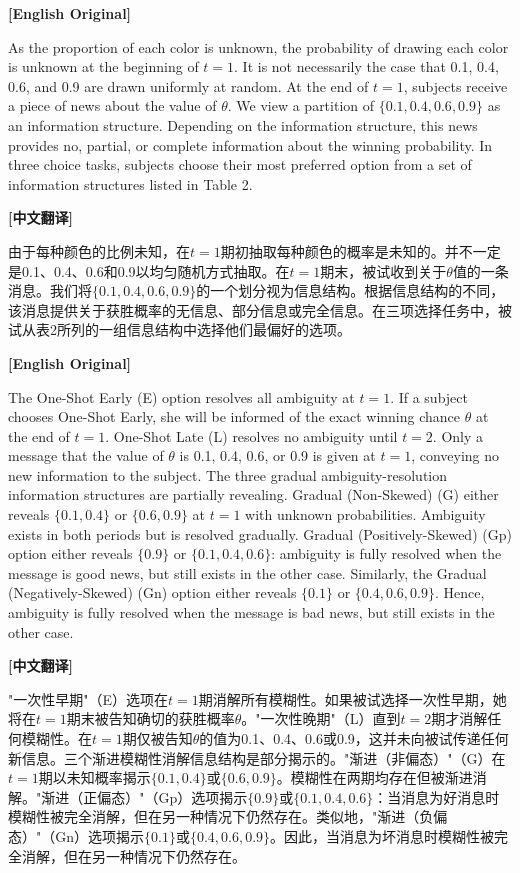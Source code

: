 \documentclass[12pt,a4paper]{ctexart}
\newenvironment{original}{%
  \par\medskip\noindent\textbf{[English Original]}\par\smallskip
  \color{black}\small
}{%
  \par\medskip
}
\newenvironment{translation}{%
  \par\noindent\textbf{[中文翻译]}\par\smallskip
  \color{blue}\small
}{%
  \par\bigskip
}
\theoremstyle{definition}
\theoremstyle{remark}
\begin{document}
\begin{original}
As the proportion of each color is unknown, the probability of drawing each color is unknown at the beginning of $t=1$. It is not necessarily the case that 0.1, 0.4, 0.6, and 0.9 are drawn uniformly at random. At the end of $t=1$, subjects receive a piece of news about the value of $\theta$. We view a partition of $\{0.1, 0.4, 0.6, 0.9\}$ as an information structure. Depending on the information structure, this news provides no, partial, or complete information about the winning probability. In three choice tasks, subjects choose their most preferred option from a set of information structures listed in Table 2.
\end{original}
\begin{translation}
由于每种颜色的比例未知，在$t=1$期初抽取每种颜色的概率是未知的。并不一定是0.1、0.4、0.6和0.9以均匀随机方式抽取。在$t=1$期末，被试收到关于$\theta$值的一条消息。我们将$\{0.1, 0.4, 0.6, 0.9\}$的一个划分视为信息结构。根据信息结构的不同，该消息提供关于获胜概率的无信息、部分信息或完全信息。在三项选择任务中，被试从表2所列的一组信息结构中选择他们最偏好的选项。
\end{translation}

\begin{original}
The One-Shot Early (E) option resolves all ambiguity at $t=1$. If a subject chooses One-Shot Early, she will be informed of the exact winning chance $\theta$ at the end of $t=1$. One-Shot Late (L) resolves no ambiguity until $t=2$. Only a message that the value of $\theta$ is 0.1, 0.4, 0.6, or 0.9 is given at $t=1$, conveying no new information to the subject. The three gradual ambiguity-resolution information structures are partially revealing. Gradual (Non-Skewed) (G) either reveals $\{0.1, 0.4\}$ or $\{0.6, 0.9\}$ at $t=1$ with unknown probabilities. Ambiguity exists in both periods but is resolved gradually. Gradual (Positively-Skewed) (Gp) option either reveals $\{0.9\}$ or $\{0.1, 0.4, 0.6\}$: ambiguity is fully resolved when the message is good news, but still exists in the other case. Similarly, the Gradual (Negatively-Skewed) (Gn) option either reveals $\{0.1\}$ or $\{0.4, 0.6, 0.9\}$. Hence, ambiguity is fully resolved when the message is bad news, but still exists in the other case.
\end{original}
\begin{translation}
"一次性早期"（E）选项在$t=1$期消解所有模糊性。如果被试选择一次性早期，她将在$t=1$期末被告知确切的获胜概率$\theta$。"一次性晚期"（L）直到$t=2$期才消解任何模糊性。在$t=1$期仅被告知$\theta$的值为0.1、0.4、0.6或0.9，这并未向被试传递任何新信息。三个渐进模糊性消解信息结构是部分揭示的。"渐进（非偏态）"（G）在$t=1$期以未知概率揭示$\{0.1, 0.4\}$或$\{0.6, 0.9\}$。模糊性在两期均存在但被渐进消解。"渐进（正偏态）"（Gp）选项揭示$\{0.9\}$或$\{0.1, 0.4, 0.6\}$：当消息为好消息时模糊性被完全消解，但在另一种情况下仍然存在。类似地，"渐进（负偏态）"（Gn）选项揭示$\{0.1\}$或$\{0.4, 0.6, 0.9\}$。因此，当消息为坏消息时模糊性被完全消解，但在另一种情况下仍然存在。
\end{translation}
\end{document}

